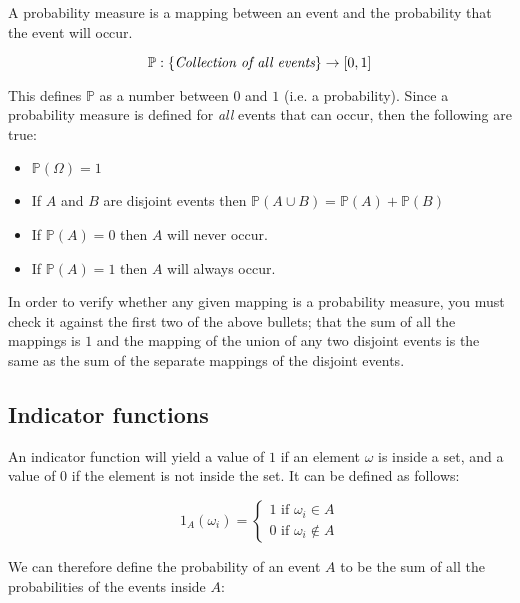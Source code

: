 A probability measure is a mapping between an event and the probability that the
event will occur.

\begin{dmath}
	\mathbb{P} : \{\textrm{\it Collection of all events}\} \rightarrow [0,1]
\end{dmath}

This defines $\mathbb{P}$ as a number between $0$ and $1$ (i.e. a probability).
Since a probability measure is defined for {\it all} events that can occur, then
the following are true:

\begin{itemize}
	\item $\mathbb{P}(\Omega) = 1$
	\item If $A$ and $B$ are disjoint events then $\mathbb{P}(A \cup B) = \mathbb{P}(A) + \mathbb{P}(B)$
	\item If $\mathbb{P}(A) = 0$ then $A$ will never occur.
	\item If $\mathbb{P}(A) = 1$ then $A$ will always occur.
\end{itemize}


In order to verify whether any given mapping is a probability measure, you must
check it against the first two of the above bullets; that the sum of all the
mappings is $1$ and the mapping of the union of any two disjoint events is the
same as the sum of the separate mappings of the disjoint events.

\subsection{Indicator functions}

An indicator function will yield a value of $1$ if an element $\omega$ is inside
a set, and a value of $0$ if the element is not inside the set. It can be
defined as follows:

\begin{dmath}
	1_A(\omega_i) = \begin{cases} 
						1\textrm{ if }\omega_i \in A\\
						0\textrm{ if }\omega_i \not\in A
					\end{cases}
\end{dmath}

We can therefore define the probability of an event $A$ to be the sum of all the
probabilities of the events inside $A$:

